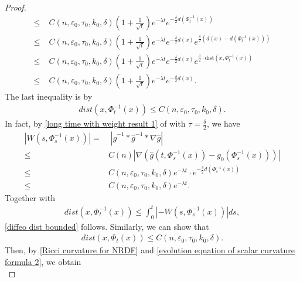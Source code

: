 \documentclass[12pt]{amsart}
\begin{document}
\begin{proof}
\begin{equation}
\begin{split}
        \leq&\; C(n,\varepsilon_0,\tau_0, k_0, \delta) \left(1 + \frac{1}{\sqrt{t}} \right) e^{-\lambda t} e^{-\frac{\delta}{2}d(\Phi_t^{-1}(x))}\\
        \leq&\; C(n,\varepsilon_0,\tau_0, k_0, \delta)\left(1 + \frac{1}{\sqrt{t}} \right) e^{-\lambda t} e^{-\frac{\delta}{2}d(x)} e^{\frac{\delta}{2}(d(x) - d(\Phi_t^{-1}(x)))}\\
        \leq&\; C(n,\varepsilon_0,\tau_0, k_0, \delta) \left(1 + \frac{1}{\sqrt{t}} \right) e^{-\lambda t} e^{-\frac{\delta}{2}d(x)} e^{\frac{\delta}{2}\cdot \mathrm{dist}(x, \Phi_t^{-1}(x))}\\
        \leq&\; C(n,\varepsilon_0,\tau_0, k_0, \delta) \left(1 + \frac{1}{\sqrt{t}} \right) e^{-\lambda t} e^{-\frac{\delta}{2}d(x)}.
    \end{split}
\end{equation}
The last inequality is by
\begin{align}\label{diffeo dist bounded}
    dist(x, \Phi_t^{-1}(x))\leq C(n,\varepsilon_0,\tau_0, k_0, \delta).
\end{align}
In fact, by \eqref{long time with weight result 1} of  with $\tau = \frac{\delta}{2}$, we have  
\begin{equation}
    \begin{split}
        |W(s, \Phi^{-1}_{s}(x))| =&\; |\hat{g}^{-1} * \hat{g}^{-1} * \nabla\hat{g}|\\
        \leq&  C(n) |\nabla(\hat{g}(t, \Phi_{s}^{-1}(x)) - g_0(\Phi_{s}^{-1}(x)))|\\
        \leq& C(n,\varepsilon_0,\tau_0, k_0, \delta) e^{-\lambda t}\cdot e^{- \frac{\delta}{2} d(\Phi_{s}^{-1}(x))}\\
        \leq& C(n,\varepsilon_0,\tau_0, k_0, \delta)e^{-\lambda t}.
    \end{split}
\end{equation}
Together with 
\begin{align}
    dist(x, \Phi_t^{-1}(x)) \leq \int_{0}^{t} |-W(s, \Phi_s^{-1}(x))| ds, 
\end{align}
\eqref{diffeo dist bounded} follows. Similarly, we can show that 
\begin{align}\label{evolution equation of scalar curvature formula 8}
    dist(x, \Phi_t(x))\leq C(n,\varepsilon_0,\tau_0, k_0, \delta).
\end{align}
Then, by \eqref{Ricci curvature for NRDF} and \eqref{evolution equation of scalar curvature formula 2}, we obtain
\begin{equation}\label{evolution equation of scalar curvature formula 3}

\end{equation}
\end{proof}
\end{document}
